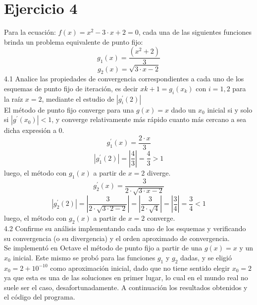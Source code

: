\documentclass{article}
\begin{document}
\section{Ejercicio 4}
Para la ecuación: $f(x) = x^2 - 3\cdot x + 2 = 0$, cada una de las siguientes
funciones brinda un problema equivalente de punto fijo:
\[g_1(x)=\dfrac{(x^2+2)}{3}\]
\[g_2(x)=\sqrt{3\cdot x -2}\]
4.1 Analice las propiedades de convergencia correspondientes a cada uno de los esquemas
de punto fijo de iteración, es decir $x{k+1} = g_i(x_k)$ con $i = 1,2$ para la raíz $x = 2$, mediante
el estudio de $|g_i^{'}(2)|$\\

El método de punto fijo converge para una $g(x)=x$ dado un $x_0$ inicial si y solo si $|g^{'}(x_0)|<1$, y converge relativamente más rápido cuanto más cercano a sea dicha expresión a 0.\\
\[g_1^{'}(x) = \dfrac{2 \cdot x}{3}\]
\[|g_1^{'}(2)| = |\dfrac{4}{3}| = \dfrac{4}{3} > 1\]
luego, el método con $g_1(x)$ a partir de $x=2$ diverge.
\[g_2^{'}(x) = \dfrac{3}{2\cdot \sqrt{3 \cdot x - 2}}\]
\[|g_2^{'}(2)| = |\dfrac{3}{2\cdot \sqrt{3 \cdot 2 - 2}}| = |\dfrac{3}{2\cdot \sqrt{4}}| = |\dfrac{3}{4}| = \dfrac{3}{4} < 1\]
luego, el método con $g_2(x)$ a partir de $x=2$ converge.\\

4.2 Confirme su análisis implementando cada uno de los esquemas y verificando su
convergencia (o su divergencia) y el orden aproximado de convergencia.\\

Se implementó en Octave el método de punto fijo a partir de una $g(x)=x$ y un $x_0$ inicial. Este mismo se probó para las funciones $g_1$ y $g_2$ dadas, y se eligió $x_0=2+10^{-10}$ como aproximación inicial, dado que no tiene sentido elegir $x_0=2$ ya que esta es una de las soluciones en primer lugar, lo cual en el mundo real no suele ser el caso, desafortunadamente. A continuación los resultados obtenidos y el código del programa.\\
\end{document}
